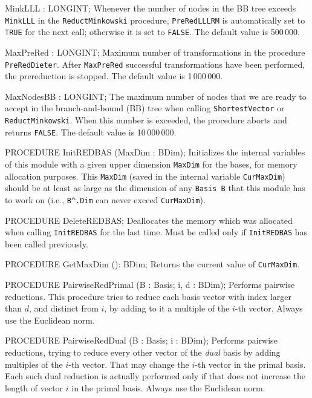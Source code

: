    MinkLLL : LONGINT;
\endcode
 \tabb  
   Whenever the number of nodes in the BB tree exceeds {\tt MinkLLL}
   in the {\tt ReductMinkowski} procedure,
   {\tt PreRedLLLRM} is automatically set to {\tt TRUE} for the
   next call; otherwise it is set to {\tt FALSE}.
   The default value is 500\,000.
  \endtabb
\code

   MaxPreRed : LONGINT;
\endcode
 \tabb
   Maximum number of transformations in the procedure {\tt PreRedDieter}.
   After {\tt MaxPreRed} successful transformations have been performed,
   the prereduction is stopped.
   The default value is 1\,000\,000.
  \endtabb
\code

   MaxNodesBB : LONGINT;     
\endcode
  \tabb The maximum number of nodes that we are ready to accept
   in the branch-and-bound (BB) tree when calling {\tt ShortestVector}
   or {\tt ReductMinkowski}.  When this number is exceeded, the procedure
   aborts and returns {\tt FALSE}.
   The default value is 10\,000\,000.
  \endtabb
\code


PROCEDURE InitREDBAS (MaxDim : BDim);
\endcode
  \tab  Initializes the internal variables of this 
   module with a given upper dimension {\tt MaxDim}
   for the bases, for memory allocation purposes.
   This {\tt MaxDim} (saved in the internal variable {\tt CurMaxDim})
   should be at least as large as the dimension of any
   {\tt Basis B} that this module has to work on (i.e., {\tt B\^{}.Dim}
   can never exceed {\tt CurMaxDim}).
   \endtab
\code

PROCEDURE DeleteREDBAS;
\endcode
  \tab Deallocates the memory which was allocated when calling
  {\tt InitREDBAS} for the last time.
   Must be called only if {\tt InitREDBAS} has been called previously.
  \endtab
\code

PROCEDURE GetMaxDim (): BDim;
\endcode
  \tab  Returns the current value of {\tt CurMaxDim}.
   \endtab
\code

PROCEDURE PairwiseRedPrimal (B : Basis;  i, d : BDim);
\endcode
  \tab  Performs pairwise reductions.
  This procedure tries to reduce each basis vector with 
  index larger than $d$, and distinct from $i$, by adding to it a 
  multiple of the $i$-th vector.  
  Always use the Euclidean norm.
 \endtab
\code

PROCEDURE PairwiseRedDual (B : Basis;  i : BDim);
\endcode
  \tab  Performs pairwise reductions, trying to reduce every other vector of
  the {\em dual\/} basis by adding multiples of the $i$-th vector.
  That may change the $i$-th vector in the primal basis.
  Each such dual reduction is actually performed only if that does not
  increase the length of vector $i$ in the primal basis. 
  Always use the Euclidean norm.
 \endtab
\code

